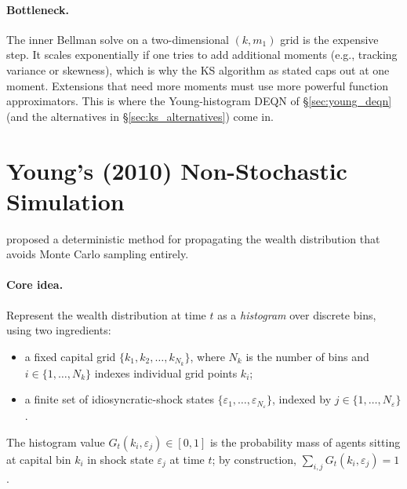 \documentclass[11pt,a4paper]{report}
\begin{document}
\paragraph{Bottleneck.}
The inner Bellman solve on a two-dimensional $(k, m_1)$ grid is the expensive step.  It scales exponentially if one tries to add additional moments (e.g., tracking variance or skewness), which is why the KS algorithm as stated caps out at one moment.  Extensions that need more moments must use more powerful function approximators.  This is where the Young-histogram DEQN of §\ref{sec:young_deqn} (and the alternatives in §\ref{sec:ks_alternatives}) come in.

\section{Young's (2010) Non-Stochastic Simulation}
\label{sec:young_method}

\citet{young2010} proposed a deterministic method for propagating the wealth distribution that avoids Monte Carlo sampling entirely.

\paragraph{Core idea.}
Represent the wealth distribution at time $t$ as a \emph{histogram} over discrete bins, using two ingredients:
\begin{itemize}[itemsep=1pt, leftmargin=*]
\item a fixed capital grid $\{k_1, k_2, \ldots, k_{N_k}\}$, where $N_k$ is the number of bins and $i \in \{1,\ldots,N_k\}$ indexes individual grid points $k_i$;
\item a finite set of idiosyncratic-shock states $\{\varepsilon_1,\ldots,\varepsilon_{N_\varepsilon}\}$, indexed by $j \in \{1,\ldots,N_\varepsilon\}$.
\end{itemize}
The histogram value $G_t(k_i, \varepsilon_j) \in [0,1]$ is the probability mass of agents sitting at capital bin $k_i$ in shock state $\varepsilon_j$ at time $t$; by construction, $\sum_{i,j} G_t(k_i, \varepsilon_j) = 1$.
\end{document}
